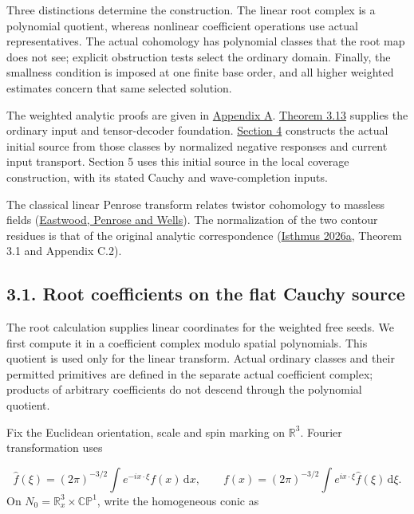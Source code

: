 \documentclass[
  english,
  11pt,
  reqno]{amsart}
\begin{document}
Three distinctions determine the construction. The linear root complex
is a polynomial quotient, whereas nonlinear coefficient operations use
actual representatives. The actual cohomology has polynomial classes
that the root map does not see; explicit obstruction tests select the
ordinary domain. Finally, the smallness condition is imposed at one
finite base order, and all higher weighted estimates concern that same
selected solution.

The weighted analytic proofs are given in
\hyperref[app:online-weighted-construction]{Appendix A}.
\hyperref[thm:online-ordinary-pair-data-bijection]{Theorem 3.13}
supplies the ordinary input and tensor-decoder foundation.
\hyperref[sec:online-actual-source-execution]{Section 4} constructs the
actual initial source from those classes by normalized negative
responses and current input transport. Section 5 uses this initial
source in the local coverage construction, with its stated Cauchy and
wave-completion inputs.

The classical linear Penrose transform relates twistor cohomology to
massless fields (\hyperref[ref-EastwoodPenroseWells1981]{Eastwood,
Penrose and Wells}). The normalization of the two contour residues is
that of the original analytic correspondence
(\hyperref[ref-IsthmusLocal2026]{Isthmus 2026a}, Theorem 3.1 and
Appendix C.2).

\subsection{3.1. Root coefficients on the flat Cauchy
source}\label{root-coefficients-on-the-flat-cauchy-source}\label{sec:online-root-complex}

The root calculation supplies linear coordinates for the weighted free
seeds. We first compute it in a coefficient complex modulo spatial
polynomials. This quotient is used only for the linear transform. Actual
ordinary classes and their permitted primitives are defined in the
separate actual coefficient complex; products of arbitrary coefficients
do not descend through the polynomial quotient.

Fix the Euclidean orientation, scale and spin marking on
\(\mathbb R^3\). Fourier transformation uses

\label{eq:online-root-fourier-convention} \[
\widehat f(\xi)=(2\pi)^{-3/2}\int e^{-ix\cdot\xi}f(x)\,\mathrm dx,
\qquad
f(x)=(2\pi)^{-3/2}\int e^{ix\cdot\xi}\widehat f(\xi)\,\mathrm d\xi.
\] On \(N_0=\mathbb R^3_x\times\mathbb{CP}^1\), write the homogeneous
conic as
\end{document}
